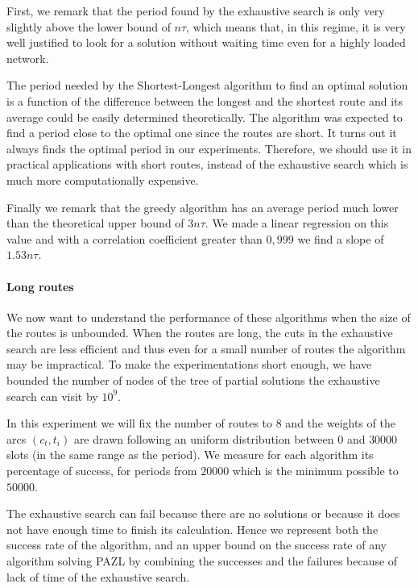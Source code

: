 \documentclass[a4paper,10pt]{article}
\begin{document}
      First, we remark that the period found by the exhaustive search is only very slightly above the lower bound of 
      $n\tau$, which means that, in this regime, it is very well justified to look for a solution without waiting time even for a highly loaded network. 
      
      The period needed by the Shortest-Longest algorithm to find an optimal solution is a function of the difference between the longest and the shortest route and its average could be easily determined theoretically. The algorithm was expected to find a period close to the optimal one since the routes are short. It turns out it always finds the optimal period in our experiments. Therefore, we should use it in practical applications with short routes, instead of the exhaustive search which is much more computationally expensive. 
      
      Finally we remark that the greedy algorithm has an average period much lower than the theoretical upper bound of $3n\tau$. We made a linear regression on this value and with a correlation coefficient greater than $0,999$ we find a slope of $1.53n\tau$.
      
      

      \paragraph{Long routes}
      
      We now want to understand the performance of these algorithms when the size of the routes is unbounded. When the routes are long, the cuts in the exhaustive search are less efficient and thus even for a small number of routes the algorithm may be impractical. To make the experimentations short enough, we have bounded the number of nodes of the tree of partial solutions the exhaustive search can visit by $10^9$.
      
      In this experiment we will fix the number of routes to $8$ and the weights of the arcs $(c_t,t_i)$ are drawn following an uniform distribution between $0$ and $30000$ slots (in the same range as the period).
      We measure for each algorithm its percentage of success, for periods from $20000$ which is the minimum possible to $50000$.
      
      The exhaustive search can fail because there are no solutions or because it does not have enough time to finish its calculation. Hence we represent both the success rate of the algorithm, and an upper bound on the success rate of any algorithm solving PAZL by combining the successes and the failures because of lack of time of the exhaustive search. 
      
\end{document}
